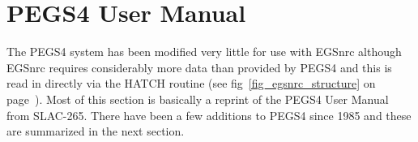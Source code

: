 
%
%
%
%
%
%
%
%
%


%



\section{PEGS4 User Manual}
\label{pegs4}


The PEGS4 system has been modified very little for use with EGSnrc although
EGSnrc requires considerably more data than provided by PEGS4 and this is
read in directly via the HATCH routine (see fig~\ref{fig_egsnrc_structure}
on page~\pageref{fig_egsnrc_structure}).  Most of this section is basically
a reprint of the PEGS4 User Manual from SLAC-265.  There have been a few
additions to PEGS4 since 1985 and these are summarized in the next section.

